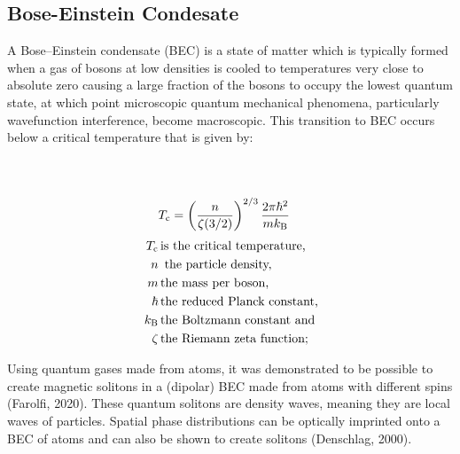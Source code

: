 \documentclass{article}
\begin{document}
    \subsection{Bose-Einstein Condesate}
    
    
    A Bose–Einstein condensate (BEC) is a state of matter which is typically formed when a gas of bosons at low densities is cooled to temperatures very close to absolute zero causing a large fraction of the bosons to occupy the lowest quantum state, at which point microscopic quantum mechanical phenomena, particularly wavefunction interference, become macroscopic. This transition to BEC occurs below a critical temperature that is given by:
    \begin{multicols}{2}
    \noindent
    \begin{align*}
        \\
        \\
        \displaystyle T_{\rm {c}} &=\left({\frac {n}{\zeta (3/2)}}\right)^{2/3}{\frac {2\pi \hbar ^{2}}{mk_{\rm {B}}}} 
    \end{align*}
    \begin{align*}
        {\displaystyle \,T_{\rm {c}}} \,  &\text{is the critical temperature,}\\
        \displaystyle \,n \, 	 &\text{ the particle density,}\\
        {\displaystyle \,m}	\, &\text{the mass per boson,}\\
        {\displaystyle \hbar } \, 	&\text{the reduced Planck constant,}\\
        {\displaystyle \,k_{\rm {B}}}\, 	&\text{the Boltzmann constant and}\\
        {\displaystyle \,\zeta }\, 	&\text{the Riemann zeta function;}
    \end{align*}
    \end{multicols}
    Using quantum gases made from atoms, it was demonstrated to be possible to create magnetic solitons in a (dipolar) BEC made from atoms with different spins (Farolfi, 2020). These quantum solitons are density waves, meaning they are local waves of particles. Spatial phase distributions can be optically imprinted onto a BEC of atoms and can also be shown to create solitons (Denschlag, 2000). 
\end{document}
